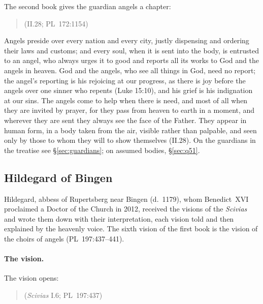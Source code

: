 The second book gives the guardian angels a chapter:

\begin{quote}
 (II.28; PL~172:1154)
\end{quote}

\noindent Angels preside over every nation and every city, justly
dispensing and ordering their laws and customs; and every soul, when it is
sent into the body, is entrusted to an angel, who always urges it to good
and reports all its works to God and the angels in heaven. God and the
angels, who see all things in God, need no report; the angel's reporting
is his rejoicing at our progress, as there is joy before the angels over
one sinner who repents (Luke 15:10), and his grief is his indignation at our
sins. The angels come to help when there is need, and most of all when they
are invited by prayer, for they pass from heaven to earth in a moment, and
wherever they are sent they always see the face of the Father. They appear
in human form, in a body taken from the air, visible rather than palpable,
and seen only by those to whom they will to show themselves (II.28). On the
guardians in the treatise see \S\ref{sec:guardians}; on assumed bodies,
\S\ref{sec:q51}.

\sectionguard
\subsection{Hildegard of Bingen}\label{sec:fa-hildegard}

Hildegard, abbess of Rupertsberg near Bingen (d.~1179), whom Benedict~XVI
proclaimed a Doctor of the Church in 2012, received the visions of the
\emph{Scivias} and wrote them down with their interpretation, each vision
told and then explained by the heavenly voice. The sixth vision of the
first book is the vision of the choirs of angels (PL~197:437--441).

\paragraph{The vision.} The vision opens:

\begin{quote}
 (\emph{Scivias} I.6;
PL~197:437)
\end{quote}

